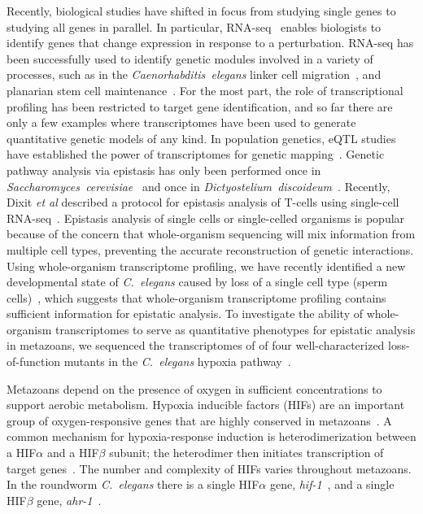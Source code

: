 \documentclass[9pt,twocolumn,twoside,lineno]{pnas-new}
\newcommand{\cel}{\emph{C.~elegans}}
\newcommand{\gene}[1]{\mbox{\emph{#1}}}
\begin{document}
Recently, biological studies have shifted in focus from studying single
genes to studying all genes in parallel. In particular,
RNA-seq~\cite{Mortazavi2008} enables biologists to
identify genes that change expression in response to a perturbation.
RNA-seq has been successfully used to identify genetic modules involved in a
variety of processes, such as in the \emph{Caenorhabditis~elegans} linker cell
migration~\cite{Schwarz2012}, and planarian stem cell
maintenance~\cite{VanWolfswinkel2014,Scimone2014}. For the most part, the role
of transcriptional profiling has been restricted to target gene identification,
and so far there are only a few examples where transcriptomes have been used to
generate quantitative genetic models of any kind. In population genetics, eQTL
studies have established the power of transcriptomes for genetic
mapping~\cite{Brem2002,Schadt2003,Li2006,King2014}. Genetic pathway analysis via
epistasis has only been performed once in
\emph{Saccharomyces~cerevisiae}~\cite{Hughes2000} and once in
\emph{Dictyostelium~discoideum}~\cite{VanDriessche2005}. Recently, Dixit
\emph{et al} described a protocol for epistasis analysis of T-cells using
single-cell RNA-seq~\cite{Dixit2016}. Epistasis analysis of single cells or
single-celled organisms is popular because of the concern that whole-organism
sequencing will mix information from multiple cell types, preventing the
accurate reconstruction of genetic interactions. Using whole-organism
transcriptome profiling, we have recently identified a new developmental state
of \cel{} caused by loss of a single cell type (sperm
cells)~\cite{Angeles-Albores2016a}, which suggests that whole-organism
transcriptome profiling contains sufficient information for epistatic analysis.
To investigate the ability of whole-organism transcriptomes to serve as
quantitative phenotypes for epistatic analysis in metazoans, we sequenced the
transcriptomes of of four well-characterized loss-of-function mutants in the
\cel{} hypoxia pathway~\cite{Epstein2001,Shen2006,Shao2009,Jiang2001}.

Metazoans depend on the presence of oxygen in sufficient concentrations to
support aerobic metabolism. Hypoxia inducible factors (HIFs) are an
important group of oxygen-responsive genes that are highly conserved in
metazoans~\cite{Loenarz2011}. A common mechanism for hypoxia-response induction
is heterodimerization between a HIF$\alpha$ and a HIF$\beta$ subunit; the
heterodimer then initiates transcription of target genes~\cite{Jiang1996}. The
number and complexity of HIFs varies throughout metazoans. In the roundworm
\cel{} there is a single HIF$\alpha$ gene, \gene{hif-1}~\cite{Jiang2001}, and a
single HIF$\beta$ gene, \gene{ahr-1}~\cite{Powell-Coffman1998}.
\end{document}
